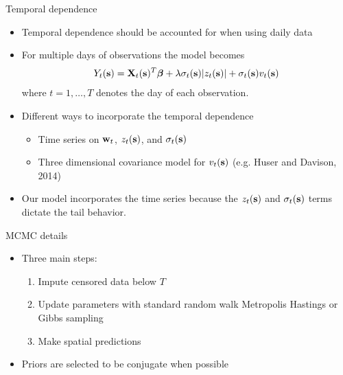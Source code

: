 \documentclass{beamer}
\begin{document}
\begin{frame}{Temporal dependence}
  \begin{itemize} \setlength{\itemsep}{0.5em}
    \item Temporal dependence should be accounted for when using daily data
    \item For multiple days of observations the model becomes
      \begin{align*}
        Y_t(\mbox{\bf s}) = \mbox{\bf X}_t(\mbox{\bf s})^T \mbox{\boldmath $\beta$} + \lambda \sigma_t(\mbox{\bf s}) | z_t(\mbox{\bf s}) | + \sigma_t(\mbox{\bf s}) v_t(\mbox{\bf s})
      \end{align*}
      where $t = 1, \ldots, T$ denotes the day of each observation.
    \item Different ways to incorporate the temporal dependence
    \begin{itemize}
      \item Time series on $\mbox{\bf w}_t$, $z_t(\mbox{\bf s})$, and $\sigma_t(\mbox{\bf s})$
      \item Three dimensional covariance model for $v_t(\mbox{\bf s})$ (e.g. Huser and Davison, 2014)
    \end{itemize}
    \item Our model incorporates the time series because the $z_t(\mbox{\bf s})$ and $\sigma_t(\mbox{\bf s})$ terms dictate the tail behavior.
  \end{itemize}
\end{frame}




\begin{frame}{MCMC details}
  \begin{itemize} \setlength{\itemsep}{0.5em}
    \item Three main steps:
    \begin{enumerate}[1.]
      \item Impute censored data below $T$
      \item Update parameters with standard random walk Metropolis Hastings or Gibbs sampling
      \item Make spatial predictions
    \end{enumerate}
    \item Priors are selected to be conjugate when possible
  \end{itemize}
\end{frame}
\end{document}
